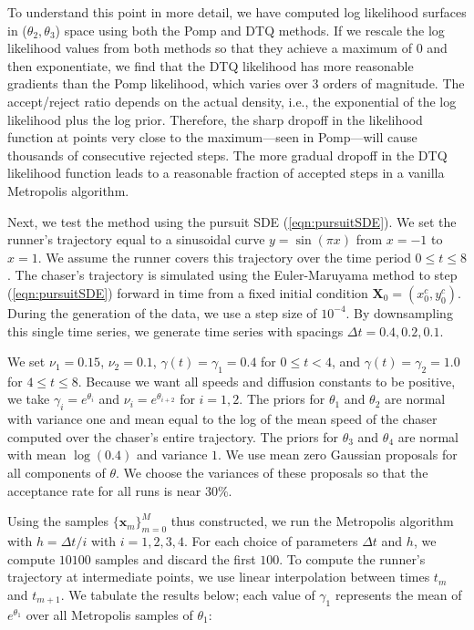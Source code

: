 \documentclass[graybox]{svmult}
\begin{document}
To understand this point in more detail, we have computed log likelihood surfaces in ($\theta_2,\theta_3$) space using both the Pomp and DTQ methods. If we rescale the log likelihood values from both methods so that they achieve a maximum of $0$ and then exponentiate, we find that the DTQ likelihood has more reasonable gradients than the Pomp likelihood, which varies over $3$ orders of magnitude. The accept/reject ratio depends on the actual density, i.e., the exponential of the log likelihood plus the log prior.  Therefore, the sharp dropoff in the likelihood function at points very close to the maximum---seen in Pomp---will cause thousands of consecutive rejected steps. The more gradual dropoff in the DTQ likelihood function leads to a reasonable fraction of accepted steps in a vanilla Metropolis algorithm.

Next, we test the method using the pursuit SDE
(\ref{eqn:pursuitSDE}).  We set the runner's trajectory equal to a
sinusoidal curve $y = \sin (\pi x)$ from $x=-1$ to $x=1$.  We assume
the runner covers this trajectory over the time period $0 \leq t \leq
8$.  The chaser's trajectory is simulated using the Euler-Maruyama
method to step (\ref{eqn:pursuitSDE}) forward in time from a fixed
initial condition $\mathbf{X}_0 = (x^c_0, y^c_0)$.  During the
generation of the data, we use a step size of $10^{-4}$.  By
downsampling this single time series, we generate time series with
spacings $\Delta t = 0.4, 0.2, 0.1$.  

We set $\nu_1
= 0.15$, $\nu_2 = 0.1$, $\gamma(t) = \gamma_1 = 0.4$ for $0 \leq t < 4$,
and $\gamma(t) = \gamma_2 = 1.0$ for $4 \leq t \leq 8$.
Because we want all speeds and diffusion constants to be positive, we
take $\gamma_i = e^{\theta_i}$ and $\nu_i = e^{\theta_{i+2}}$ for $i =
1, 2$.  The priors for $\theta_1$ and $\theta_2$ are normal with
variance one and mean equal to the log of the mean speed of the chaser computed over the chaser's
entire trajectory. The priors for $\theta_3$ and $\theta_4$ are normal with mean
$\log(0.4)$ and variance $1$.  We use mean zero Gaussian proposals for all
components of $\theta$.  We choose the variances of these proposals so
that the acceptance rate for all runs is near $30\%$.

Using the samples $\{\mathbf{x}_m\}^M_{m=0}$ thus constructed, we run
the Metropolis algorithm with $h = \Delta t / i$ with $i = 1, 2, 3,
4$.  For each choice of parameters $\Delta t$ and $h$, we compute $10100$ samples and discard the first $100$.  To compute the runner's trajectory at intermediate points, we use
linear interpolation between times $t_m$ and $t_{m+1}$.  We tabulate
the results below; each value of $\gamma_1$ represents the mean of
$e^{\theta_1}$ over all Metropolis samples of $\theta_1$:
\end{document}
